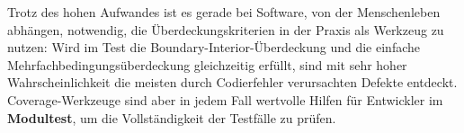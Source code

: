 \noindent
Trotz des hohen Aufwandes ist es gerade bei Software, von der Menschenleben abhängen, notwendig, die Überdeckungskriterien in der Praxis als Werkzeug zu nutzen: Wird im Test die Boundary-Interior-Überdeckung und die einfache Mehrfachbedingungsüberdeckung gleichzeitig erfüllt, sind mit sehr hoher Wahrscheinlichkeit die meisten durch Codierfehler verursachten Defekte entdeckt.\\

\noindent
Coverage-Werkzeuge sind aber in jedem Fall wertvolle Hilfen für Entwickler im \textbf{Modultest}, um die Vollständigkeit der Testfälle zu prüfen.